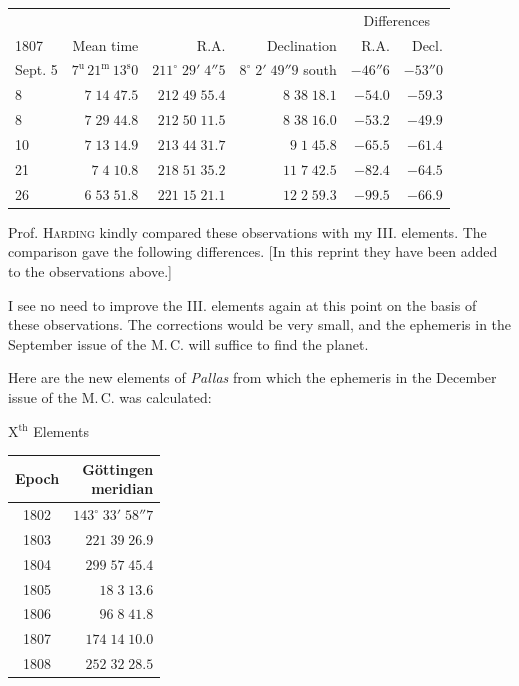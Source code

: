 \begin{center}\fontsize{9}{11}\selectfont\setlength{\tabcolsep}{2pt}\renewcommand{\arraystretch}{1.15}\begin{tabular}{lrrrrr}
& & & & \multicolumn{2}{c}{Differences}\\
1807 & Mean time & R.A. & Declination & R.A. & Decl.\\\hline
Sept. 5 & $7^{\text{u}}\,21^{\text{m}}\,13^{\text{s}}0$ & $211^\circ\;29'\;4''5$ & $8^\circ\;2'\;49''9$ south & $-46''6$ & $-53''0$\\
8 & $7\;14\;47.5$ & $212\;49\;55.4$ & $8\;38\;18.1$ & $-54.0$ & $-59.3$\\
8 & $7\;29\;44.8$ & $212\;50\;11.5$ & $8\;38\;16.0$ & $-53.2$ & $-49.9$\\
10 & $7\;13\;14.9$ & $213\;44\;31.7$ & $9\;1\;45.8$ & $-65.5$ & $-61.4$\\
21 & $7\;4\;10.8$ & $218\;51\;35.2$ & $11\;7\;42.5$ & $-82.4$ & $-64.5$\\
26 & $6\;53\;51.8$ & $221\;15\;21.1$ & $12\;2\;59.3$ & $-99.5$ & $-66.9$\\
\end{tabular}\end{center}

\par\indent Prof. \textsc{Harding} kindly compared these observations with my III. elements. The comparison gave the following differences. [In this reprint they have been added to the observations above.]

\par\indent I see no need to improve the III. elements again at this point on the basis of these observations. The corrections would be very small, and the ephemeris in the September issue of the M.\,C. will suffice to find the planet.

\par\indent Here are the new elements of \emph{Pallas} from which the ephemeris in the December issue of the M.\,C. was calculated:

\begin{center}
X$^{\text{th}}$ Elements
\end{center}


\begin{center}\fontsize{10}{12}\selectfont\setlength{\tabcolsep}{2pt}\renewcommand{\arraystretch}{1.15}\begin{tabular}{cr}
Epoch & \shortstack{Göttingen\\meridian}\\\hline
1802 & $143^\circ\;33'\;58''7$\\
1803 & $221\;39\;26.9$\\
1804 & $299\;57\;45.4$\\
1805 & $18\;3\;13.6$\\
1806 & $96\;8\;41.8$\\
1807 & $174\;14\;10.0$\\
1808 & $252\;32\;28.5$\\
\end{tabular}\end{center}

